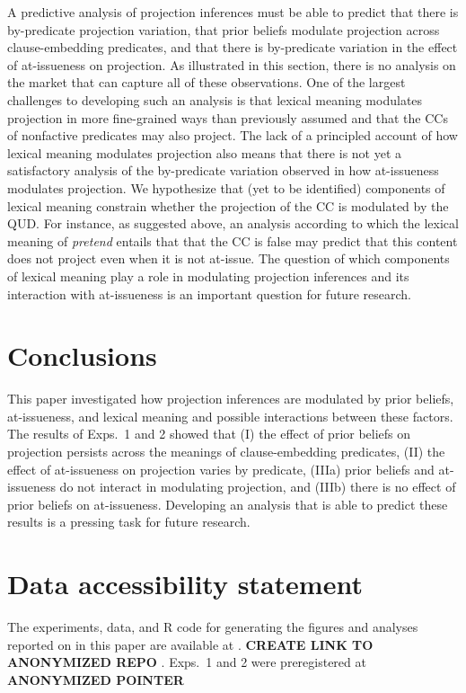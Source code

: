 \documentclass[11pt,fleqn]{article}
\newcommand{\6}{\mbox{$[\hspace*{-.6mm}[$}}
\newcommand{\9}{\mbox{$]\hspace*{-.6mm}]$}}
\begin{document}
A predictive analysis of projection inferences must be able to predict that there is by-predicate projection variation, that prior beliefs modulate projection across clause-embedding predicates, and that there is by-predicate variation in the effect of at-issueness on projection. As illustrated in this section, there is no analysis on the market that can capture all of these observations. One of the largest challenges to developing such an analysis is that lexical meaning modulates projection in more fine-grained ways than previously assumed and that the CCs of nonfactive predicates may also project. The lack of a principled account of how lexical meaning modulates projection also means that there is not yet a satisfactory analysis of the by-predicate variation observed in how at-issueness modulates projection. We hypothesize that (yet to be identified) components of lexical meaning constrain whether the projection of the CC  is modulated by the QUD. For instance, as suggested above, an analysis according to which the lexical meaning of {\em pretend} entails that that the CC is false may predict that this content does not project even when it is not at-issue. The question of which components of lexical meaning play a role in modulating projection inferences and its interaction with at-issueness is an important question for future research.


\section{Conclusions}\label{s5}

This paper investigated how projection inferences are modulated by prior beliefs, at-issueness, and lexical meaning and possible interactions between these factors. The results of Exps.~1 and 2 showed that (I) the effect of prior beliefs on projection persists across the meanings of clause-embedding predicates, (II) the effect of at-issueness on projection varies by predicate, (IIIa) prior beliefs and at-issueness do not interact in modulating projection, and (IIIb) there is no effect of prior beliefs on at-issueness. Developing an analysis that is able to predict these results is a pressing task for future research.

\newpage

\section*{Data accessibility statement}

The experiments, data, and R code for generating the figures and analyses reported on in this paper are available at 
\url{}. {\bf CREATE LINK TO ANONYMIZED REPO}
.  Exps.~1 and 2 were preregistered at \url{} {\bf ANONYMIZED POINTER}
\end{document}
